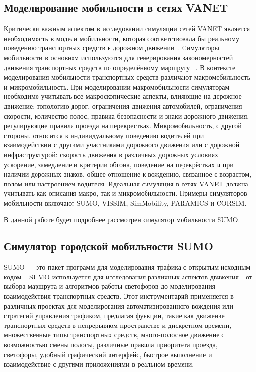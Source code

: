 \subsection*{Моделирование мобильности в сетях VANET}

Критически важным аспектом в исследовании симуляции сетей VANET является необходимость в модели мобильности, которая соответствовала бы реальному поведению транспортных средств в дорожном движении~\cite{akhtar2014vehicle}. Симуляторы мобильности в основном используются для генерирования закономерностей движения транспортных средств по определённому маршруту ~\cite{lan2008realistic}. В контексте моделирования мобильности транспортных средств различают макромобильность и микромобильность. При моделировании макромобильности симуляторам необходимо учитывать все макроскопические аспекты, влияющие на дорожное движение: топологию дорог, ограничения движения автомобилей, ограничения скорости, количество полос, правила безопасности и знаки дорожного движения, регулирующие правила проезда на перекрестках.
Микромобильность, с другой стороны, относится к индивидуальному поведению водителей при взаимодействии с другими участниками дорожного движения или с дорожной инфраструктурой: скорость движения в различных дорожных условиях, ускорение, замедление и критерии обгона, поведение на перекрёстках и при наличии дорожных знаков, общее отношение к вождению, связанное с возрастом, полом или настроением водителя. Идеальная симуляция в сетях VANET должна учитывать как описания макро, так и микромобильности. Примеры симуляторов мобильности включают SUMO, VISSIM, SimMobility, PARAMICS и CORSIM. \

В данной работе будет подробнее рассмотрен симулятор мобильности SUMO.

\subsection*{Симулятор городской мобильности SUMO}

SUMO — это пакет программ для моделирования трафика с открытым исходным кодом~\cite{sumo_docs}. SUMO используется для исследования различных аспектов движения - от выбора маршрута и алгоритмов работы светофоров до моделирования взаимодействия транспортных средств. Этот инструментарий применяется в различных проектах для моделирования автоматизированного вождения или стратегий управления трафиком, предлагая функции, такие как движение транспортных средств в непрерывном пространстве и дискретном времени, множественные типы транспортных средств, много-полосное движение с возможностью смены полосы, различные правила приоритета проезда, светофоры, удобный графический интерфейс, быстрое выполнение и взаимодействие с другими приложениями в реальном времени.

